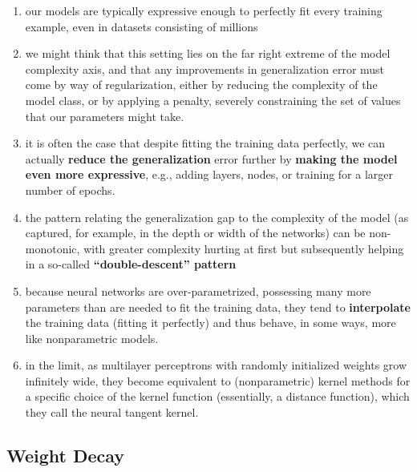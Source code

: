 \begin{enumerate}
    \item our models are typically expressive enough to perfectly fit every training example, even in datasets consisting of millions

    \item we might think that this setting lies on the far right extreme of the model complexity axis, and that any improvements in generalization error must come by way of regularization, either by reducing the complexity of the model class, or by applying a penalty, severely constraining the set of values that our parameters might take.

    \item it is often the case that despite fitting the training data perfectly, we can actually \textbf{reduce the generalization} error further by \textbf{making the model even more expressive}, e.g., adding layers, nodes, or training for a larger number of epochs.

    \item the pattern relating the generalization gap to the complexity of the model (as captured, for example, in the depth or width of the networks) can be non-monotonic, with greater complexity hurting at first but subsequently helping in a so-called \textbf{“double-descent” pattern}

    \item because neural networks are over-parametrized, possessing many more parameters than are needed to fit the training data, they tend to \textbf{interpolate} the training data (fitting it perfectly) and thus behave, in some ways, more like nonparametric models.

    \item in the limit, as multilayer perceptrons with randomly initialized weights grow infinitely wide, they become equivalent to (nonparametric) kernel methods for a specific choice of the kernel function (essentially, a distance function), which they call the neural tangent kernel.

    
\end{enumerate}



\subsection{Weight Decay \cite{dnn-1}}\label{regularization techniques: Weight Decay}

